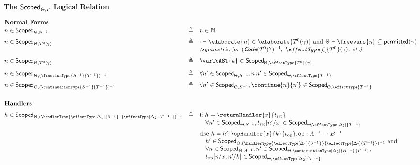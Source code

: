 \begin{figure}
\begin{source-desc}
  {\large\textbf{The $\textsf{Scoped}_{{\Theta}, {T}}$ Logical Relation}}
  \vspace{5mm}

  $
  \begin{array}{@{}lllr}
    \textbf{Normal Forms} \\\vspace{2mm}
    n \in \scoped{\mathbb{N}^{-1}} & \triangleq & n \in \mathbb{N} \\ 
    n \in \scoped{{T}^{0}(\gamma)} & \triangleq & \cdot \vdash \elaborate{n} \in \elaborate{T^{0} (\gamma)} \text{ and } \Theta \vdash \freevars{n} \subseteq \textsf{permitted}(\gamma) \\\vspace{2mm}
    && \textit{(symmetric for $(\textsf{Code}(T^0)^{\gamma})^{-1}$, $\effectType[\xi]{T^{0}} (\gamma)$, etc) }\\\vspace{2mm}
    n \in \scoped{\underline{{T}^{0}(\gamma)}} & \triangleq & \varToAST{n} \in \scoped{\effectType{T^{0}} (\gamma)} \\ \vspace{2mm}
    n \in \scoped{(\functionType{{S}^{-1}}{{T}^{-1}})^{-1}} & \triangleq & \forall n' \in \scoped{{S}^{-1}}, n \, n' \in \scoped{\effectType{T^{-1}}} \\ \vspace{2mm}
    n \in \scoped{(\continuationType{{S}^{-1}}{{T}^{-1}})^{-1}} & \triangleq & \forall n' \in \scoped{{S}^{-1}}, \continue{n}{n'} \in \scoped{\effectType{T^{-1}}} \\\\ \vspace{2mm}
    \textbf{Handlers} \\
    h \in \scoped{(\handlerType{\effectType[\Delta_1]{{S}^{-1}}}{\effectType[\Delta_2]{{T}^{-1}}})^{-1}} & \triangleq & \text{if } h = \returnHandler{x}{t_{\text{ret}}}\\ \vspace{2mm}
    && \quad \forall n' \in \scoped{{S}^{-1}}, t_{\text{ret}}[n'/x] \in \scoped{\effectType[\Delta_2]{T^{-1}}} \\
    && \text{else } h = h'; \opHandler{x}{k}{t_{\text{op}}}, \textsf{op}: A^{-1} \to B^{-1} \\
    && \quad h' \in \scoped{(\handlerType{\effectType[\Delta_1]{{S}^{-1}}}{\effectType[\Delta_2]{{T}^{-1}}})^{-1}} \text{ and}\\ 
    && \quad \forall n \in \scoped{{A}^{-1}}, n' \in \scoped{\continuationType[\Delta_2]{{B}^{-1}}{T^{-1}}}, \\ && \quad t_{\text{op}}[n/x, n'/k] \in \scoped{\effectType[\Delta_2]{T^{-1}}}\\\\
  \end{array}
$


\end{source-desc}
\end{figure}
